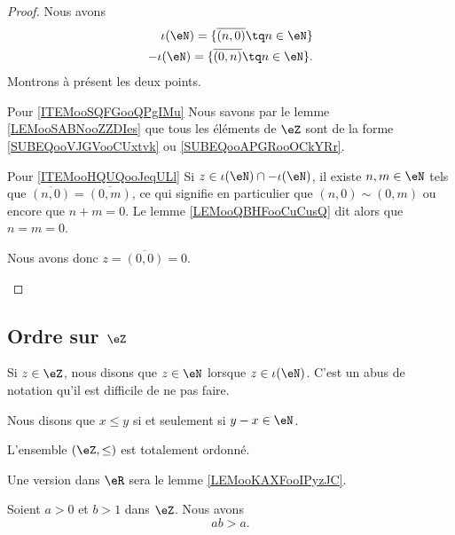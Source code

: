 \begin{proof}
    Nous avons
    \begin{subequations}
        \begin{align}
            \iota(\eN)=\{ \overline{ (n,0) }\tq n\in \eN \}  \label{SUBEQooVJGVooCUxtvk}\\
            -\iota(\eN)=\{ \overline{ (0,n) }\tq n\in \eN \}.   \label{SUBEQooAPGRooOCkYRr}
        \end{align}
    \end{subequations}
    Montrons à présent les deux points.
    \begin{subproof}
    \item[Pour \ref{ITEMooSQFGooQPgIMu}]
        Nous savons par le lemme \ref{LEMooSABNooZZDIes} que tous les éléments de \( \eZ\) sont de la forme \eqref{SUBEQooVJGVooCUxtvk} ou \eqref{SUBEQooAPGRooOCkYRr}.
    \item[Pour \ref{ITEMooHQUQooJeqULl}]
        Si \( z\in \iota(\eN)\cap -\iota(\eN)\), il existe \( n,m\in \eN\) tels que \( \overline{ (n,0) }=\overline{ (0,m) }\), ce qui signifie en particulier que \( (n,0)\sim(0,m)\) ou encore que \( n+m=0\). Le lemme \ref{LEMooQBHFooCuCusQ} dit alors que \( n=m=0\).

        Nous avons donc \( z= \overline{ (0,0) }=0\).
    \end{subproof}
\end{proof}

\subsection{Ordre sur \( \eZ\)}

Si \( z\in \eZ\), nous disons que \( z\in \eN\) lorsque \( z\in \iota(\eN)\). C'est un abus de notation qu'il est difficile de ne pas faire.

\begin{propositionDef}       \label{PROPooMYYDooOABOdB}
    Nous disons que \( x\leq y\) si et seulement si \( y-x\in \eN\).

    L'ensemble \( (\eZ, \leq)\) est totalement ordonné.
\end{propositionDef}

Une version dans \( \eR\) sera le lemme \ref{LEMooKAXFooIPyzJC}.
\begin{lemma}       \label{LEMooSVDDooWsyxNP}
    Soient \( a>0\) et \( b>1\) dans \( \eZ\). Nous avons
    \begin{equation}
        ab>a.
    \end{equation}
\end{lemma}

